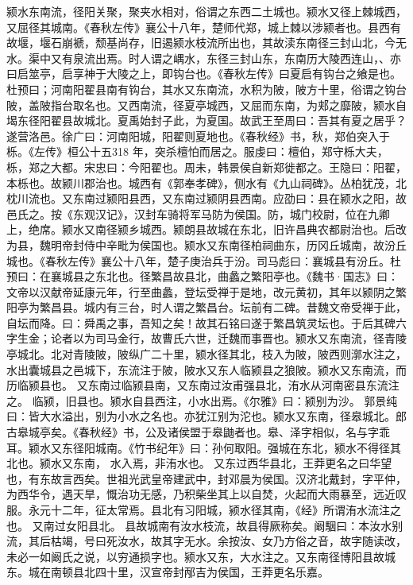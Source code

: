\documentclass[12pt,UTF8]{ctexbook}
\begin{document}
颍水东南流，径阳关聚，聚夹水相对，俗谓之东西二土城也。颍水又径上棘城西，又屈径其城南。《春秋左传》襄公十八年，楚师代郑，城上棘以涉颍者也。县西有故堰，堰石崩褫，颓基尚存，旧遏颍水枝流所出也，其故渎东南径三封山北，今无水。渠中又有泉流出焉。时人谓之嵎水，东径三封山东，东南历大陵西连山，、亦曰启筮亭，启享神于大陵之上，即钩台也。《春秋左传》曰夏启有钩台之飨是也。杜预曰；河南阳翟县南有钩台，其水又东南流，水积为陂，陂方十里，俗谓之钩台陂，盖陂指台取名也。又西南流，径夏亭城西，又屈而东南，为郏之靡陂，颍水自堨东径阳翟县故城北。夏禹始封子此，为夏国。故武王至周曰：吾其有夏之居乎？遂营洛邑。徐广曰：河南阳城，阳翟则夏地也。《春秋经》书，秋，郑伯突入于栎。《左传》桓公十五318 年，突杀檀怕而居之。服虔曰：檀伯，郑守栎大夫，栎，郑之大都。宋忠曰：今阳翟也。周未，韩景侯自新郑徙都之。王隐曰：阳翟，本栎也。故颍川郡治也。城西有《郭奉孝碑》，侧水有《九山祠碑》。丛柏犹茂，北枕川流也。又东南过颍阳县西，又东南过颍阴县西南。应劭曰：县在颍水之阳，故邑氏之。按《东观汉记》，汉封车骑将军马防为侯国。防，城门校尉，位在九卿上，绝席。颍水又南径颍乡城西。颍朗县故城在东北，旧许昌典农都尉治也。后改为县，魏明帝封侍中辛毗为侯国也。颍水又东南径柏祠曲东，历冈丘城南，故汾丘城也。《春秋左传》襄公十八年，楚子庚治兵于汾。司马彪曰：襄城县有汾丘。杜预曰：在襄城县之东北也。径繁昌故县北，曲蠡之繁阳亭也。《魏书·国志》曰：文帝以汉献帝延康元年，行至曲蠡，登坛受禅于是地，改元黄初，其年以颍阴之繁阳亭为繁昌县。城内有三台，时人谓之繁昌台。坛前有二碑。昔魏文帝受禅于此，自坛而降。曰：舜禹之事，吾知之矣！故其石铭曰遂于繁昌筑灵坛也。于后其碑六字生金；论者以为司马金行，故曹氏六世，迁魏而事晋也。颍水又东南流，径青陵亭城北。北对青陵陂，陂纵广二十里，颍水径其北，枝入为陂，陂西则漷水注之，水出囊城县之邑城下，东流注于陂，陂水又东人临颍县之狼陂。颍水又东南流，而历临颍县也。
又东南过临颍县南，又东南过汝甫强县北，洧水从河南密县东流注之。
临颍，旧县也。颍水自县西注，小水出焉。《尔雅》曰：颍别为沙。
郭景纯曰：皆大水溢出，别为小水之名也。亦犹江别为沱也。颍水又东南，径皋城北。郎古皋城亭矣。《春秋经》书，公及诸侯盟于皋鼬者也。皋、泽字相似，名与字乖耳。颖水又东径阳城南。《竹书纪年》曰：孙何取阳。强城在东北，颍水不得径其北也。颍水又东南， 水入焉，非洧水也。
又东过西华县北，王莽更名之曰华望也，有东故言西矣。世祖光武皇帝建武中，封邓晨为侯国。汉济北戴封，字平仲，为西华令，遇天旱，慨治功无感，乃积柴坐其上以自焚，火起而大雨暴至，远近叹服。永元十二年，征太常焉。县北有习阳城，颍水径其南，《经》所谓洧水流注之也。
又南过女阳县北。
县故城南有汝水枝流，故县得厥称矣。阚駰曰：本汝水别流，其后枯竭，号曰死汝水，故其字无水。余按汝、女乃方俗之音，故字随读改，未必一如阚氏之说，以穷通损字也。颍水又东，大水注之。又东南径博阳县故城东。城在南顿县北四十里，汉宣帝封邴吉为侯国，王莽更名乐嘉。
\end{document}
